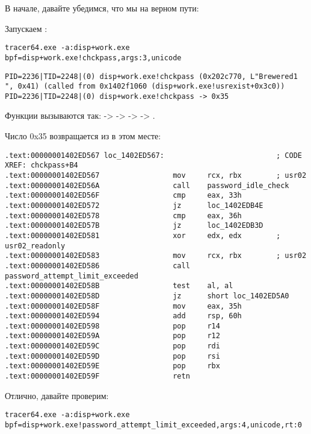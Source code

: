 В начале, давайте убедимся, что мы на верном пути:

Запускаем \tracer:

\begin{lstlisting}
tracer64.exe -a:disp+work.exe bpf=disp+work.exe!chckpass,args:3,unicode
\end{lstlisting}

\begin{lstlisting}
PID=2236|TID=2248|(0) disp+work.exe!chckpass (0x202c770, L"Brewered1                               ", 0x41) (called from 0x1402f1060 (disp+work.exe!usrexist+0x3c0))
PID=2236|TID=2248|(0) disp+work.exe!chckpass -> 0x35
\end{lstlisting}

Функции вызываются так:  ->  ->  ->  -> .

Число 0x35 возвращается из  в этом месте:

\begin{lstlisting}
.text:00000001402ED567 loc_1402ED567:                          ; CODE XREF: chckpass+B4
.text:00000001402ED567                 mov     rcx, rbx        ; usr02
.text:00000001402ED56A                 call    password_idle_check
.text:00000001402ED56F                 cmp     eax, 33h
.text:00000001402ED572                 jz      loc_1402EDB4E
.text:00000001402ED578                 cmp     eax, 36h
.text:00000001402ED57B                 jz      loc_1402EDB3D
.text:00000001402ED581                 xor     edx, edx        ; usr02_readonly
.text:00000001402ED583                 mov     rcx, rbx        ; usr02
.text:00000001402ED586                 call    password_attempt_limit_exceeded
.text:00000001402ED58B                 test    al, al
.text:00000001402ED58D                 jz      short loc_1402ED5A0
.text:00000001402ED58F                 mov     eax, 35h
.text:00000001402ED594                 add     rsp, 60h
.text:00000001402ED598                 pop     r14
.text:00000001402ED59A                 pop     r12
.text:00000001402ED59C                 pop     rdi
.text:00000001402ED59D                 pop     rsi
.text:00000001402ED59E                 pop     rbx
.text:00000001402ED59F                 retn
\end{lstlisting}

Отлично, давайте проверим:

\begin{lstlisting}
tracer64.exe -a:disp+work.exe bpf=disp+work.exe!password_attempt_limit_exceeded,args:4,unicode,rt:0
\end{lstlisting}

